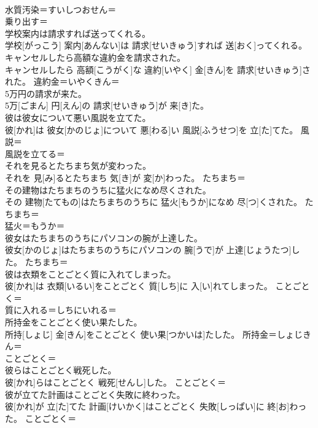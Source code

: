 \documentclass[8pt]{extreport}
\begin{document}
\begin{CJK}{UTF8}{min}
\\	水質汚染＝すいしつおせん＝ 
\\	乗り出す＝ 
\\	学校案内は請求すれば送ってくれる。	
\\	学校[がっこう] 案内[あんない]は 請求[せいきゅう]すれば 送[おく]ってくれる。	
\\	キャンセルしたら高額な違約金を請求された。	
\\	キャンセルしたら 高額[こうがく]な 違約[いやく] 金[きん]を 請求[せいきゅう]された。	違約金＝いやくきん＝ 
\\	5万円の請求が来た。	
\\	5万[ごまん] 円[えん]の 請求[せいきゅう]が 来[き]た。	
\\	彼は彼女について悪い風説を立てた。	
\\	彼[かれ]は 彼女[かのじょ]について 悪[わる]い 風説[ふうせつ]を 立[た]てた。	風説＝ 
\\	風説を立てる＝ 
\\	それを見るとたちまち気が変わった。	
\\	それを 見[み]るとたちまち 気[き]が 変[か]わった。	たちまち＝ 
\\	その建物はたちまちのうちに猛火になめ尽くされた。	
\\	その 建物[たてもの]はたちまちのうちに 猛火[もうか]になめ 尽[つ]くされた。	たちまち＝ 
\\	猛火＝もうか＝ 
\\	彼女はたちまちのうちにパソコンの腕が上達した。	
\\	彼女[かのじょ]はたちまちのうちにパソコンの 腕[うで]が 上達[じょうたつ]した。	たちまち＝ 
\\	彼は衣類をことごとく質に入れてしまった。	
\\	彼[かれ]は 衣類[いるい]をことごとく 質[しち]に 入[い]れてしまった。	ことごとく＝ 
\\	質に入れる＝しちにいれる＝ 
\\	所持金をことごとく使い果たした。	
\\	所持[しょじ] 金[きん]をことごとく 使い果[つかいは]たした。	所持金＝しょじきん＝ 
\\	ことごとく＝ 
\\	彼らはことごとく戦死した。	
\\	彼[かれ]らはことごとく 戦死[せんし]した。	ことごとく＝ 
\\	彼が立てた計画はことごとく失敗に終わった。	
\\	彼[かれ]が 立[た]てた 計画[けいかく]はことごとく 失敗[しっぱい]に 終[お]わった。	ことごとく＝ 

\end{CJK}
\end{document}
